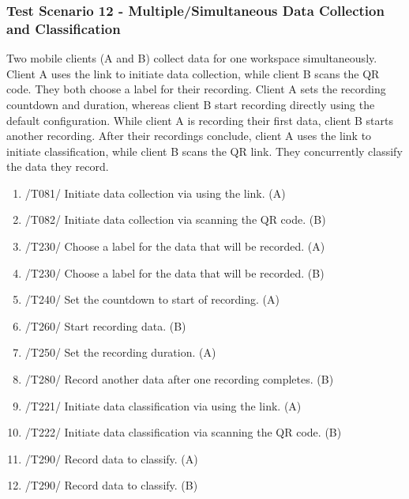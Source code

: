 \subsubsection{Test Scenario 12 - Multiple/Simultaneous Data Collection and Classification}
Two mobile clients (A and B) collect data for one workspace simultaneously. Client A uses the link to initiate data collection, while client B scans the QR code. They both choose a label for their recording. Client A sets the recording countdown and duration, whereas client B start recording directly using the default configuration. While client A is recording their first data, client B starts another recording. After their recordings conclude, client A uses the link to initiate classification, while client B scans the QR link. They concurrently classify the data they record.
\begin{enumerate}
    \item /T081/ Initiate data collection via using the link. (A)
    \item /T082/ Initiate data collection via scanning the \gls{QR code}. (B)
    \item /T230/ Choose a \gls{label} for the data that will be recorded. (A)
    \item /T230/ Choose a \gls{label} for the data that will be recorded. (B)
    \item /T240/ Set the countdown to start of recording. (A)
    \item /T260/ Start recording data. (B)
    \item /T250/ Set the recording duration. (A)
    \item /T280/ Record another data after one recording completes. (B)
    \item /T221/ Initiate data \gls{classification} via using the link. (A)
    \item /T222/ Initiate data \gls{classification} via scanning the QR code. (B)
    \item /T290/ Record data to classify. (A)
    \item /T290/ Record data to classify. (B)
\end{enumerate}
